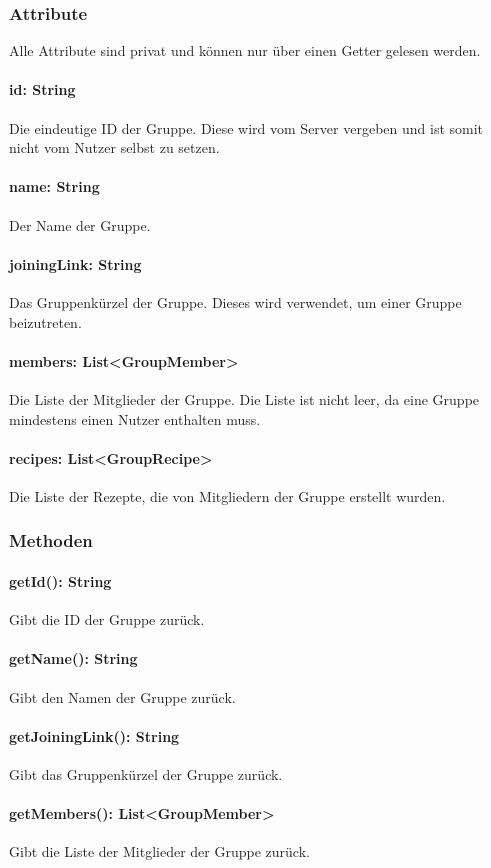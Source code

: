 \documentclass[parskip=full]{scrartcl}
\begin{document}
\subsubsection{Attribute}
Alle Attribute sind privat und können nur über einen Getter gelesen werden.
\paragraph{id: String}
Die eindeutige ID der Gruppe. Diese wird vom Server vergeben und ist somit nicht vom Nutzer selbst zu setzen.
\paragraph{name: String}
Der Name der Gruppe.
\paragraph{joiningLink: String}
Das Gruppenkürzel der Gruppe. Dieses wird verwendet, um einer Gruppe beizutreten.
\paragraph{members: List<GroupMember>}
Die Liste der Mitglieder der Gruppe. Die Liste ist nicht leer, da eine Gruppe mindestens einen Nutzer enthalten muss.
\paragraph{recipes: List<GroupRecipe>}
Die Liste der Rezepte, die von Mitgliedern der Gruppe erstellt wurden.

\subsubsection{Methoden}
\paragraph{getId(): String}
Gibt die ID der Gruppe zurück.
\paragraph{getName(): String}
Gibt den Namen der Gruppe zurück.
\paragraph{getJoiningLink(): String}
Gibt das Gruppenkürzel der Gruppe zurück.
\paragraph{getMembers(): List<GroupMember>}
Gibt die Liste der Mitglieder der Gruppe zurück.
\end{document}
